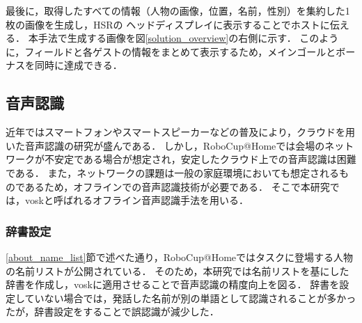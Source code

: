 \documentclass[a4j]{jarticle}
\begin{document}
最後に，取得したすべての情報（人物の画像，位置，名前，性別）を集約した1枚の画像を生成し，HSRの
ヘッドディスプレイに表示することでホストに伝える．
本手法で生成する画像を図\ref{solution_overview}の右側に示す．
このように，フィールドと各ゲストの情報をまとめて表示するため，メインゴールとボーナスを同時に達成できる．


\subsection{音声認識}
近年ではスマートフォンやスマートスピーカーなどの普及により，クラウドを用いた音声認識の研究が盛んである\cite{google_speech_api, amazon_speech_api}．
しかし，RoboCup@Homeでは会場のネットワークが不安定である場合が想定され，安定したクラウド上での音声認識は困難である．
また，ネットワークの課題は一般の家庭環境においても想定されるものであるため，オフラインでの音声認識技術が必要である．
そこで本研究では，vosk\cite{vosk_hp}と呼ばれるオフライン音声認識手法を用いる．


\subsubsection{辞書設定}
\ref{about_name_list}節で述べた通り，RoboCup@Homeではタスクに登場する人物の名前リストが公開されている．
そのため，本研究では名前リストを基にした辞書を作成し，voskに適用させることで音声認識の精度向上を図る．
辞書を設定していない場合では，発話した名前が別の単語として認識されることが多かったが，辞書設定をすることで誤認識が減少した．
\end{document}
